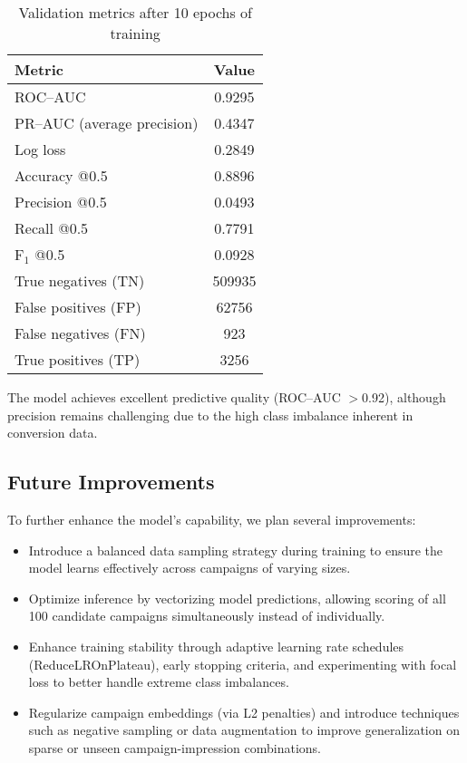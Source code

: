 \documentclass[11pt]{article}
\begin{document}
\begin{table}[H]
  \centering
  \caption{Validation metrics after 10 epochs of training}
  \label{tab:metrics}
  \begin{tabular}{l@{\quad}S}
    \toprule
    Metric & {Value} \\
    \midrule
    ROC–AUC & 0.9295 \\
    PR–AUC (average precision) & 0.4347 \\
    Log loss & 0.2849 \\
    Accuracy @{0.5} & 0.8896 \\
    Precision @{0.5} & 0.0493 \\
    Recall @{0.5} & 0.7791 \\
    F$_1$ @{0.5} & 0.0928 \\
    \midrule
    True negatives (TN) & \num{509935} \\
    False positives (FP) & \num{62756}  \\
    False negatives (FN) & \num{923}      \\
    True positives (TP) & \num{3256}   \\
    \bottomrule
  \end{tabular}
\end{table}

The model achieves excellent predictive quality (ROC–AUC \(>\)0.92), although precision remains challenging due to the high class imbalance inherent in conversion data.

\subsection{Future Improvements}

To further enhance the model's capability, we plan several improvements:

\begin{itemize}
  \item Introduce a balanced data sampling strategy during training to ensure the model learns effectively across campaigns of varying sizes.
  \item Optimize inference by vectorizing model predictions, allowing scoring of all 100 candidate campaigns simultaneously instead of individually.
  \item Enhance training stability through adaptive learning rate schedules (ReduceLROnPlateau), early stopping criteria, and experimenting with focal loss to better handle extreme class imbalances.
  \item Regularize campaign embeddings (via L2 penalties) and introduce techniques such as negative sampling or data augmentation to improve generalization on sparse or unseen campaign-impression combinations.
\end{itemize}
\end{document}
